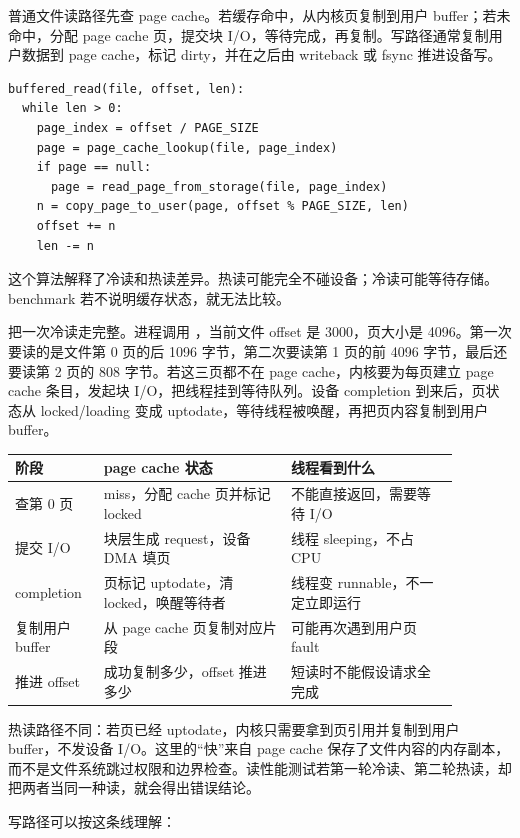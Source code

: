 普通文件读路径先查 page cache。若缓存命中，从内核页复制到用户 buffer；若未命中，分配 page cache 页，提交块 I/O，等待完成，再复制。写路径通常复制用户数据到 page cache，标记 dirty，并在之后由 writeback 或 fsync 推进设备写。

\begin{lstlisting}
buffered_read(file, offset, len):
  while len > 0:
    page_index = offset / PAGE_SIZE
    page = page_cache_lookup(file, page_index)
    if page == null:
      page = read_page_from_storage(file, page_index)
    n = copy_page_to_user(page, offset % PAGE_SIZE, len)
    offset += n
    len -= n
\end{lstlisting}

这个算法解释了冷读和热读差异。热读可能完全不碰设备；冷读可能等待存储。benchmark 若不说明缓存状态，就无法比较。

把一次冷读走完整。进程调用 ，当前文件 offset 是 3000，页大小是 4096。第一次要读的是文件第 0 页的后 1096 字节，第二次要读第 1 页的前 4096 字节，最后还要读第 2 页的 808 字节。若这三页都不在 page cache，内核要为每页建立 page cache 条目，发起块 I/O，把线程挂到等待队列。设备 completion 到来后，页状态从 locked/loading 变成 uptodate，等待线程被唤醒，再把页内容复制到用户 buffer。

\begin{longtable}{|p{0.16\linewidth}|p{0.38\linewidth}|p{0.34\linewidth}|}
\toprule
阶段 & page cache 状态 & 线程看到什么 \\
\midrule
查第 0 页 & miss，分配 cache 页并标记 locked & 不能直接返回，需要等待 I/O \\\tablerowrule
提交 I/O & 块层生成 request，设备 DMA 填页 & 线程 sleeping，不占 CPU \\\tablerowrule
completion & 页标记 uptodate，清 locked，唤醒等待者 & 线程变 runnable，不一定立即运行 \\\tablerowrule
复制用户 buffer & 从 page cache 页复制对应片段 & 可能再次遇到用户页 fault \\\tablerowrule
推进 offset & 成功复制多少，offset 推进多少 & 短读时不能假设请求全完成 \\
\bottomrule
\end{longtable}

热读路径不同：若页已经 uptodate，内核只需要拿到页引用并复制到用户 buffer，不发设备 I/O。这里的“快”来自 page cache 保存了文件内容的内存副本，而不是文件系统跳过权限和边界检查。读性能测试若第一轮冷读、第二轮热读，却把两者当同一种读，就会得出错误结论。

写路径可以按这条线理解：

